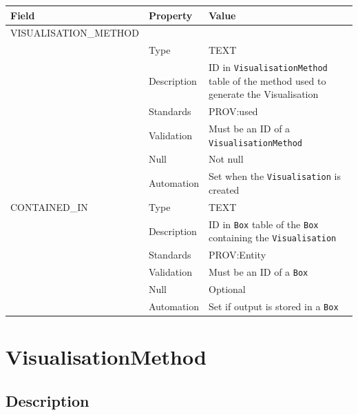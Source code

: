 \documentclass[
]{article}
\newcounter{none} %
\begin{document}
{\def\LTcaptype{none} %
\begin{longtable}[]{@{}
  >{\raggedright\arraybackslash}p{}
  >{\raggedright\arraybackslash}p{}
  >{\raggedright\arraybackslash}p{}@{}}
\toprule\noalign{}
\begin{minipage}[b]{\linewidth}\raggedright
Field
\end{minipage} & \begin{minipage}[b]{\linewidth}\raggedright
Property
\end{minipage} & \begin{minipage}[b]{\linewidth}\raggedright
Value
\end{minipage} \\
\midrule\noalign{}
\endhead
\bottomrule\noalign{}
\endlastfoot
VISUALISATION\_METHOD & & \\
& Type & TEXT \\
& Description & ID in \texttt{VisualisationMethod} table of the method
used to generate the Visualisation \\
& Standards & PROV:used \\
& Validation & Must be an ID of a \texttt{VisualisationMethod} \\
& Null & Not null \\
& Automation & Set when the \texttt{Visualisation} is created \\
CONTAINED\_IN & Type & TEXT \\
& Description & ID in \texttt{Box} table of the \texttt{Box} containing
the \texttt{Visualisation} \\
& Standards & PROV:Entity \\
& Validation & Must be an ID of a \texttt{Box} \\
& Null & Optional \\
& Automation & Set if output is stored in a \texttt{Box} \\
\end{longtable}
}

\section{VisualisationMethod}\label{visualisationmethod}

\subsection{Description}\label{description-40}
\end{document}
